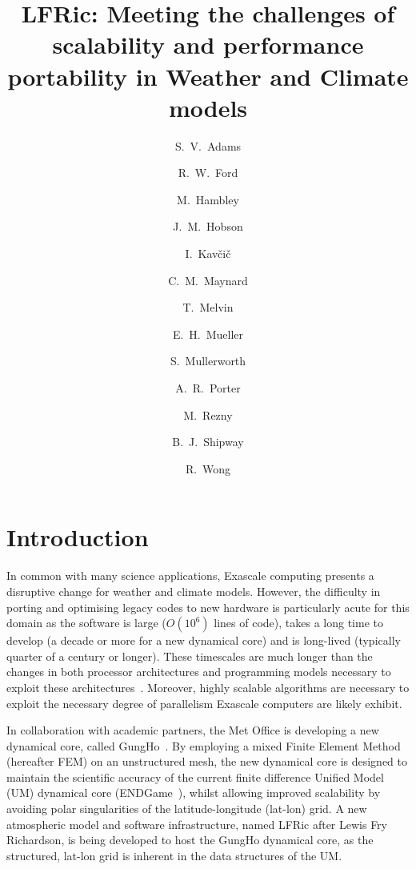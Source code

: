 \documentclass[times]{elsarticle}
\begin{document}
\begin{frontmatter}

\title{LFRic: Meeting the challenges of scalability and performance portability in Weather and Climate models}

\author[met]{S.~V.~Adams}
\author[hartree]{R.~W.~Ford}
\author[met]{M.~Hambley}
\author[met]{J.~M.~Hobson}
\author[met]{I.~Kav\v ci\v c}
\author[met,read]{C.~M.~Maynard}
\author[met]{T.~Melvin}
\author[bath]{E.~H.~Mueller}
\author[met]{S.~Mullerworth}
\author[hartree]{A.~R.~Porter}
\author[downunder]{M.~Rezny}
\author[met]{B.~J.~Shipway}
\author[met]{R.~Wong}




\address[met]{Met Office, FitzRoy Road, Exeter, EX1 3PB}
\address[hartree]{Hartree Centre, STFC Daresbury, Grim up North}
\address[read]{Department of Computer Science, Polly Vacher Building,
  University of Reading, Reading, UK, RG6 6AY}
\address[bath]{Department of Mathematics, University of Bath, Bath}
\address[downunder]{Monash University, Melbourne, Australia}

\begin{abstract}
\end{abstract}

\begin{keyword}

\end{keyword}

\end{frontmatter}

\section{\label{sec:intro}Introduction}

In common with many science applications, Exascale computing presents
a disruptive change for weather and climate models. However, the
difficulty in porting and optimising legacy codes to new hardware is
particularly acute for this domain as the software is large ($O(10^6)$
lines of code), takes a long time to develop (a decade or more for a new
dynamical core) and is long-lived (typically quarter of a century or longer).
These timescales are much longer than the changes in both processor
architectures and programming models necessary to exploit these
architectures~\cite{gmd-2017-186}. Moreover, highly scalable
algorithms are necessary to exploit the necessary degree of
parallelism Exascale computers are likely exhibit.

In collaboration with academic partners, the Met Office is developing
a new dynamical core, called GungHo~\cite{melvin2018}. By employing a
mixed Finite Element Method (hereafter FEM) on an unstructured mesh, the new dynamical
core is designed to maintain the scientific accuracy of the current finite difference
Unified Model (UM) dynamical core (ENDGame~\cite{QJ:QJ2235}), whilst
allowing improved scalability by avoiding polar singularities of the
latitude-longitude (lat-lon) grid. A new atmospheric model and software infrastructure,
named LFRic after Lewis Fry Richardson, is being developed to host the
GungHo dynamical core, as the structured,  lat-lon
grid is inherent in the data structures of the UM.
\end{document}
